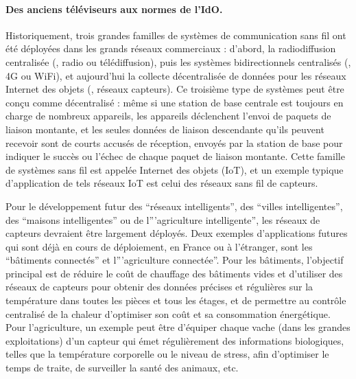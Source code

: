\begin{resume_fr}
\paragraph{Des anciens téléviseurs aux normes de l'IdO.}
%
Historiquement, trois grandes familles de systèmes de communication sans fil ont été déployées dans les grands réseaux commerciaux : d'abord, la radiodiffusion centralisée (\eg, radio ou télédiffusion), puis les systèmes bidirectionnels centralisés (\eg, 4G ou WiFi), et aujourd'hui la collecte décentralisée de données pour les réseaux Internet des objets (\eg, réseaux capteurs).
%
Ce troisième type de systèmes peut être conçu comme décentralisé :
même si une station de base centrale est
toujours en charge de nombreux appareils,
les appareils déclenchent l'envoi de paquets de liaison montante, et les seules données de liaison descendante qu'ils peuvent recevoir sont de courts accusés de réception, envoyés par la station de base pour indiquer le succès ou l'échec de chaque paquet de liaison montante.
Cette famille de systèmes sans fil est appelée Internet des objets (IoT),
et un exemple typique d'application de tels réseaux IoT est celui des réseaux sans fil de capteurs.

Pour le développement futur des ``réseaux intelligents'', des ``villes intelligentes'', des ``maisons intelligentes'' ou de l'''agriculture intelligente'', les réseaux de capteurs devraient être largement déployés.
Deux exemples d'applications futures qui sont déjà en cours de déploiement, en France ou à l'étranger, sont les ``bâtiments connectés'' et l'''agriculture connectée''.
Pour les bâtiments, l'objectif principal est de réduire le coût de chauffage des bâtiments vides et d'utiliser des réseaux de capteurs pour obtenir des données précises et régulières sur la température dans toutes les pièces et tous les étages, et de permettre au contrôle centralisé de la chaleur d'optimiser son coût et sa consommation énergétique.
Pour l'agriculture, un exemple peut être d'équiper chaque vache (dans les grandes exploitations) d'un capteur qui émet régulièrement des informations biologiques, telles que la température corporelle ou le niveau de stress, afin d'optimiser le temps de traite, de surveiller la santé des animaux, etc.



\end{resume_fr}
